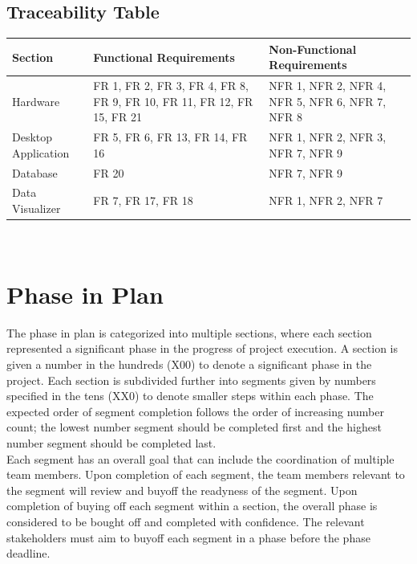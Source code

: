 \documentclass[12pt]{article}
\begin{document}
\subsection{Traceability Table}

  \begin{tabular}{| p{} | p{}| p{}|}
    \hline
    \rowcolor[gray]{0.9}
    Section & Functional Requirements & Non-Functional Requirements\\
    \hline
    Hardware & FR 1, FR 2, FR 3, FR 4, FR 8, FR 9, FR 10, FR 11, FR 12, FR 15, FR 21 & NFR 1, NFR 2, NFR 4, NFR  5, NFR 6, NFR 7, NFR 8 \\
    \hline
    Desktop Application & FR 5, FR 6, FR 13, FR 14, FR 16 & NFR 1, NFR 2, NFR 3, NFR 7, NFR 9\\
    \hline
    Database & FR 20 & NFR 7, NFR 9\\
    \hline
    Data Visualizer & FR 7, FR 17, FR 18 & NFR 1, NFR 2, NFR 7\\
    \hline
  \end{tabular}
\\


\section{Phase in Plan}

The phase in plan is categorized into multiple sections, where each section represented a significant phase in the progress of project execution. A section is given a number in the hundreds (X00) to denote a significant phase in the project. Each section is subdivided further into segments given by numbers specified in the tens (XX0) to denote smaller steps within each phase. The expected order of segment completion follows the order of increasing number count; the lowest number segment should be completed first and the highest number segment should be completed last.\\

Each segment has an overall goal that can include the coordination of multiple team members. Upon completion of each segment, the team members relevant to the segment will review and buyoff the readyness of the segment. Upon completion of buying off each segment within a section, the overall phase is considered to be bought off and completed with confidence. The relevant stakeholders must aim to buyoff each segment in a phase before the phase deadline.\\
\end{document}
